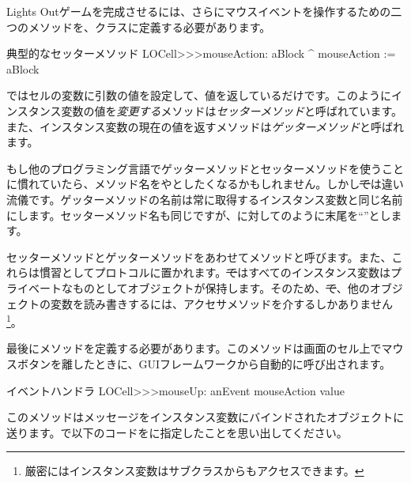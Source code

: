 \documentclass[a4paper,10pt,twoside]{book}
\begin{document}
Lights Outゲームを完成させるには、さらにマウスイベントを操作するための二つのメソッドを、クラスに定義する必要があります。

\begin{method}[mouseAction:]{典型的なセッターメソッド}
LOCell>>>mouseAction: aBlock
   ^ mouseAction := aBlock
\end{method}

 ではセルの変数に引数の値を設定して、値を返しているだけです。このようにインスタンス変数の値を\emph{変更する}メソッドは\emph{セッターメソッド}と呼ばれています。また、インスタンス変数の現在の値を返すメソッドは\emph{ゲッターメソッド}と呼ばれます。

もし他のプログラミング言語でゲッターメソッドとセッターメソッドを使うことに慣れていたら、メソッド名をやとしたくなるかもしれません。しかし\st では違い流儀です。ゲッターメソッドの名前は常に取得するインスタンス変数と同じ名前にします。セッターメソッド名も同じですが、に対してのように末尾を``\ct{:}''とします。

セッターメソッドとゲッターメソッドをあわせてメソッドと呼びます。また、これらは慣習としてプロトコルに置かれます。\st ではすべてのインスタンス変数はプライベートなものとしてオブジェクトが保持します。そのため、\st で、他のオブジェクトの変数を読み書きするには、アクセサメソッドを介するしかありません\footnote{厳密にはインスタンス変数はサブクラスからもアクセスできます。}。


最後にメソッドを定義する必要があります。このメソッドは画面のセル上でマウスボタンを離したときに、GUIフレームワークから自動的に呼び出されます。

\begin{method}[sbecellmouseup]{イベントハンドラ}
LOCell>>>mouseUp: anEvent
   mouseAction value
\end{method}



このメソッドはメッセージをインスタンス変数にバインドされたオブジェクトに送ります。で以下のコードをに指定したことを思い出してください。
\end{document}
